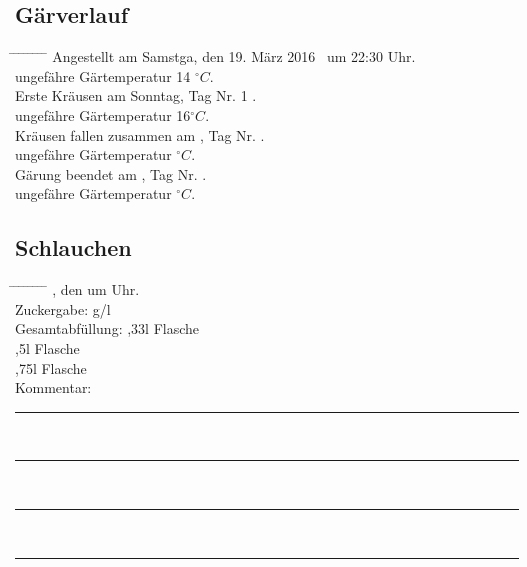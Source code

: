 \documentclass[12pt,oneside,a4paper]{scrartcl}
\begin{document}
{\subsection*{Gärverlauf}
\begin{tabbing}
	\hspace{1cm} \= \hspace{1cm} \= \hspace{1cm} \= \hspace{1cm} \= \hspace{1cm} \= \hspace{1cm} \= \hspace{1cm} \= \hspace{1cm} \= \kill
	\> Angestellt am Samstga, den 19. März 2016 \ um 22:30 Uhr.\\
	\> \> ungefähre Gärtemperatur 14 $^\circ C$.\\
	\> Erste Kräusen am Sonntag, Tag Nr. 1 .\\
	\> \> ungefähre Gärtemperatur 16$^\circ C$.\\
	\> Kräusen fallen zusammen am \hspace{4cm}, Tag Nr. \hspace{2.5cm}.\\
	\> \> ungefähre Gärtemperatur \hspace{2.5cm}$^\circ C$.\\
	\> Gärung beendet am \hspace{4cm}, Tag Nr. \hspace{2.5cm}.\\
	\> \> ungefähre Gärtemperatur \hspace{2.5cm}$^\circ C$.
\end{tabbing}
%
\subsection*{Schlauchen}
\begin{tabbing}
	\hspace{1cm} \= \hspace{1cm} \= \hspace{1cm} \= \hspace{1cm} \= \hspace{1cm} \= \hspace{1cm} \= \hspace{1cm} \= \hspace{1cm} \= \kill
	\> \hspace{4cm}, den \hspace{4cm} um \hspace{2.5cm} Uhr.\\
	\> Zuckergabe: \hspace{3.2cm} g/l\\
	\> Gesamtabfüllung: \> \> \> \> ,33l Flasche\\
	\> \> \> \> \> ,5l Flasche\\
	\> \> \> \> \> ,75l Flasche\\
	\> Kommentar: \>\>\> \rule[-0.2cm]{13cm}{1pt}\\
	\> \>  \rule[-0.2cm]{15.3cm}{1pt}\\
	\> \>  \rule[-0.2cm]{15.3cm}{1pt}\\
	\> \>  \rule[-0.2cm]{15.3cm}{1pt}		
\end{tabbing}}
\end{document}
